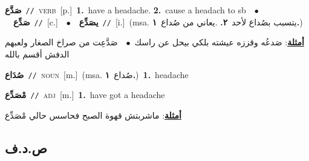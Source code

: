 \documentclass[10pt,a4paper,twoside]{article} %
\begin{document}
\begin{multicols}{2}
{\setlength\topsep{0pt}\textbf{\foreignlanguage{arabic}{صَدَّع}}\ {\color{gray}\texttt{//}\color{black}}\ \textsc{verb}\ [p.]\ \textbf{1.}~have a headache.  \textbf{2.}~cause a headach to sb\ \ $\bullet$\ \ \setlength\topsep{0pt}\textbf{\foreignlanguage{arabic}{صَدِّع}}\ {\color{gray}\texttt{//}\color{black}}\ [c.]\ \ $\bullet$\ \ \setlength\topsep{0pt}\textbf{\foreignlanguage{arabic}{يصَدِّع}}\ {\color{gray}\texttt{//}\color{black}}\ [i.]\ \color{gray}(msa. \foreignlanguage{arabic}{يتسبب بصُداع لأحد}~\foreignlanguage{arabic}{\textbf{٢.}}  .\foreignlanguage{arabic}{يعاني من صُداع}~\foreignlanguage{arabic}{\textbf{١.}})\color{black}\  \begin{flushright}\color{gray}\foreignlanguage{arabic}{\textbf{\underline{\foreignlanguage{arabic}{أمثلة}}}: صَدعُه وقززه عيشته بلكي بيحل عن راسك\ $\bullet$\ \  صَدَّعِت من صراخ الصغار ولعبهم الدفش أقسم بالله}\end{flushright}\color{black}} \vspace{2mm}

{\setlength\topsep{0pt}\textbf{\foreignlanguage{arabic}{صُدَاع}}\ {\color{gray}\texttt{//}\color{black}}\ \textsc{noun}\ [m.]\ \color{gray}(msa. \foreignlanguage{arabic}{صُداع}~\foreignlanguage{arabic}{\textbf{١.}})\color{black}\ \textbf{1.}~headache\ } \vspace{2mm}

{\setlength\topsep{0pt}\textbf{\foreignlanguage{arabic}{مْصَدِّع}}\ {\color{gray}\texttt{//}\color{black}}\ \textsc{adj}\ [m.]\ \textbf{1.}~have got a headache\  \begin{flushright}\color{gray}\foreignlanguage{arabic}{\textbf{\underline{\foreignlanguage{arabic}{أمثلة}}}: ماشربتش قهوة الصبح فحاسس حالي مْصَدِّع}\end{flushright}\color{black}} \vspace{2mm}

\vspace{-3mm}
\subsection*{\color{blue}\foreignlanguage{arabic}{ص.د.ف}\color{blue}{}} 


\end{multicols}
\end{document}
